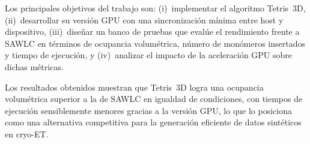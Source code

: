 Los principales objetivos del trabajo son: (i)~implementar el algoritmo Tetris~3D,
(ii)~desarrollar su versión GPU con una sincronización mínima entre host y dispositivo,
(iii)~diseñar un banco de pruebas que evalúe el rendimiento frente a SAWLC en términos de
ocupancia volumétrica, número de monómeros insertados y tiempo de ejecución, y (iv)~analizar el
impacto de la aceleración GPU sobre dichas métricas.

Los resultados obtenidos muestran que Tetris~3D logra una ocupancia volumétrica superior a la de
SAWLC en igualdad de condiciones, con tiempos de ejecución sensiblemente menores gracias a la
versión GPU, lo que lo posiciona como una alternativa competitiva para la generación eficiente
de datos sintéticos en cryo-ET.

